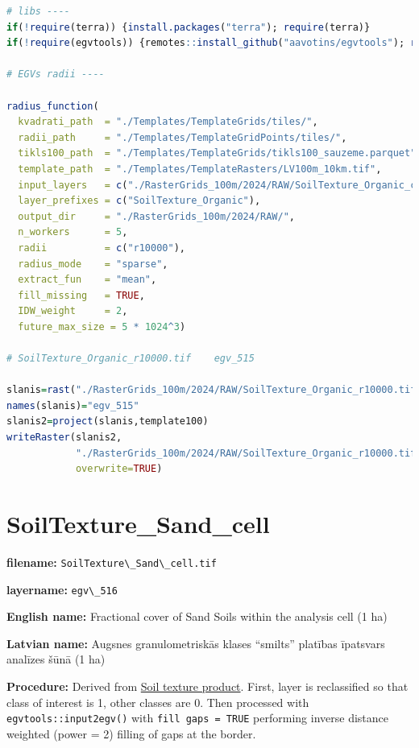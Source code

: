 \documentclass[
]{book}
\newcommand{\passthrough}[1]{#1}
\begin{document}
\begin{lstlisting}[language=R]
# libs ----
if(!require(terra)) {install.packages("terra"); require(terra)}
if(!require(egvtools)) {remotes::install_github("aavotins/egvtools"); require(egvtools)}

# EGVs radii ----

radius_function(
  kvadrati_path  = "./Templates/TemplateGrids/tiles/",
  radii_path     = "./Templates/TemplateGridPoints/tiles/",
  tikls100_path  = "./Templates/TemplateGrids/tikls100_sauzeme.parquet",
  template_path  = "./Templates/TemplateRasters/LV100m_10km.tif",
  input_layers   = c("./RasterGrids_100m/2024/RAW/SoilTexture_Organic_cell.tif"),
  layer_prefixes = c("SoilTexture_Organic"),
  output_dir     = "./RasterGrids_100m/2024/RAW/",
  n_workers      = 5,
  radii          = c("r10000"),
  radius_mode    = "sparse",
  extract_fun    = "mean",
  fill_missing   = TRUE,
  IDW_weight     = 2,
  future_max_size = 5 * 1024^3)

# SoilTexture_Organic_r10000.tif    egv_515

slanis=rast("./RasterGrids_100m/2024/RAW/SoilTexture_Organic_r10000.tif")
names(slanis)="egv_515"
slanis2=project(slanis,template100)
writeRaster(slanis2,
            "./RasterGrids_100m/2024/RAW/SoilTexture_Organic_r10000.tif",
            overwrite=TRUE)
\end{lstlisting}

\section{SoilTexture\_Sand\_cell}\label{ch06.516}

\textbf{filename:} \passthrough{\lstinline!SoilTexture\_Sand\_cell.tif!}

\textbf{layername:} \passthrough{\lstinline!egv\_516!}

\textbf{English name:} Fractional cover of Sand Soils within the analysis cell (1 ha)

\textbf{Latvian name:} Augsnes granulometriskās klases ``smilts'' platības īpatsvars analīzes šūnā (1 ha)

\textbf{Procedure:} Derived from \hyperref[Ch05.02]{Soil texture product}. First, layer is
reclassified so that class of interest is 1, other classes are 0. Then processed
with \passthrough{\lstinline!egvtools::input2egv()!} with \passthrough{\lstinline!fill gaps = TRUE!} performing inverse
distance weighted (power = 2) filling of gaps at the border.
\end{document}
